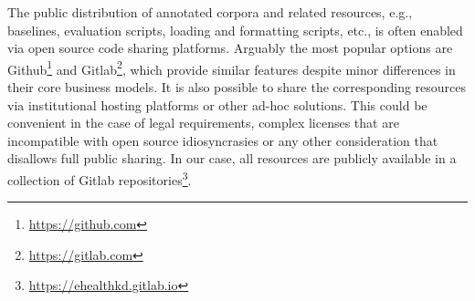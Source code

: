   \begin{table}[htb]
      \centering
      \caption{Qualitative comparison of popular annotation tools. Adapted from Table 3 in~\citet{annotation-tools}, Table~3. A symbol~\ap~indicates that the corresponding feature is only partially supported.}
      \label{tab:annotation-tools}
  \end{table}

  The public distribution of annotated corpora and related resources, e.g., baselines, evaluation scripts,
  loading and formatting scripts, etc., is often enabled via open source code sharing platforms.
  Arguably the most popular options are Github\footnote{\url{https://github.com}} and
  Gitlab\footnote{\url{https://gitlab.com}}, which provide similar features despite minor
  differences in their core business models.
  It is also possible to share the corresponding resources via institutional hosting platforms or
  other ad-hoc solutions. This could be convenient in the case of legal requirements, complex licenses that are incompatible with open source idiosyncrasies or any other consideration
  that disallows full public sharing.
  In our case, all resources are publicly available in a collection of Gitlab repositories\footnote{\url{https://ehealthkd.gitlab.io}}.

